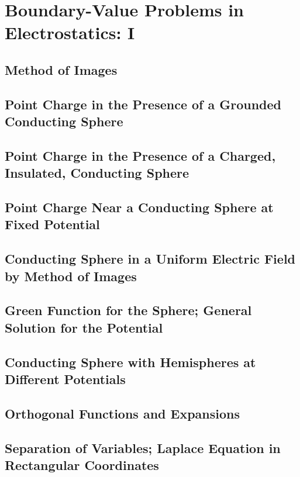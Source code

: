 \setcounter{chapter}{0}
\renewcommand{\thechapter}{2}
\chapter{Boundary-Value Problems in Electrostatics: I}
\setcounter{equation}{0}	        %

\section{Method of Images}

\section{Point Charge in the Presence of a Grounded Conducting Sphere}

\section{Point Charge in the Presence of a Charged, Insulated, Conducting Sphere}

\section{Point Charge Near a Conducting Sphere at Fixed Potential}

\section{Conducting Sphere in a Uniform Electric Field by Method of Images}

\section{Green Function for the Sphere; General Solution for the Potential}

\section{Conducting Sphere with Hemispheres at Different Potentials}

\section{Orthogonal Functions and Expansions}

\section{Separation of Variables; Laplace Equation in Rectangular Coordinates}

